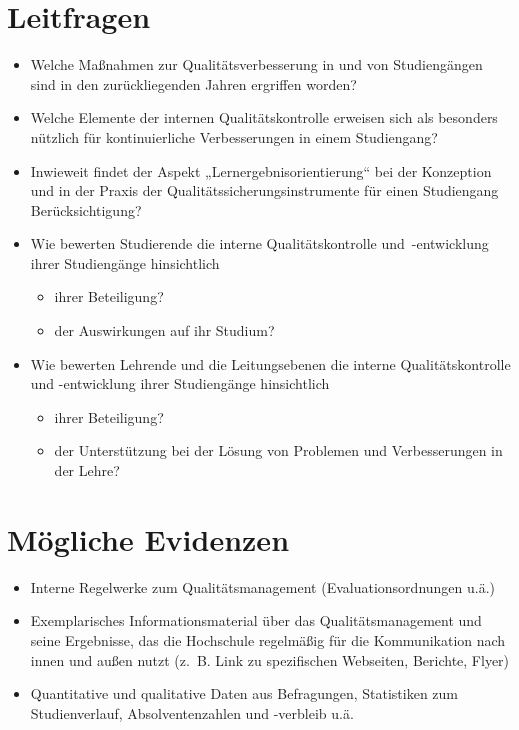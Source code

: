 \section{Leitfragen}\label{leitfragen}

\begin{itemize}
\item
  Welche Maßnahmen zur Qualitätsverbesserung in und von Studiengängen
  sind in den zurückliegenden Jahren ergriffen worden?
\item
  Welche Elemente der internen Qualitätskontrolle erweisen sich als
  besonders nützlich für kontinuierliche Verbesserungen in einem
  Studiengang?
\item
  Inwieweit findet der Aspekt „Lernergebnisorientierung`` bei der
  Konzeption und in der Praxis der Qualitätssicherungsinstrumente für
  einen Studiengang Berücksichtigung?
\item
  Wie bewerten Studierende die interne Qualitätskontrolle
  und~-entwicklung ihrer Studiengänge hinsichtlich

  \begin{itemize}
  \item
    ihrer Beteiligung?
  \item
    der Auswirkungen auf ihr Studium?
  \end{itemize}
\item
  Wie bewerten Lehrende und die Leitungsebenen die interne
  Qualitätskontrolle und -entwicklung ihrer Studiengänge hinsichtlich

  \begin{itemize}
  \item
    ihrer Beteiligung?
  \item
    der Unterstützung bei der Lösung von Problemen und Verbesserungen in
    der Lehre?
  \end{itemize}
\end{itemize}

\section{Mögliche Evidenzen}\label{muxf6gliche-evidenzen}

\begin{itemize}
\item
  Interne Regelwerke zum Qualitätsmanagement (Evaluationsordnungen u.ä.)
\item
  Exemplarisches Informationsmaterial über das Qualitätsmanagement und
  seine Ergebnisse, das die Hochschule regelmäßig für die Kommunikation
  nach innen und außen nutzt (z.~B. Link zu spezifischen Webseiten,
  Berichte, Flyer)
\item
  Quantitative und qualitative Daten aus Befragungen, Statistiken zum
  Studienverlauf, Absolventenzahlen und -verbleib u.ä.
\end{itemize}

